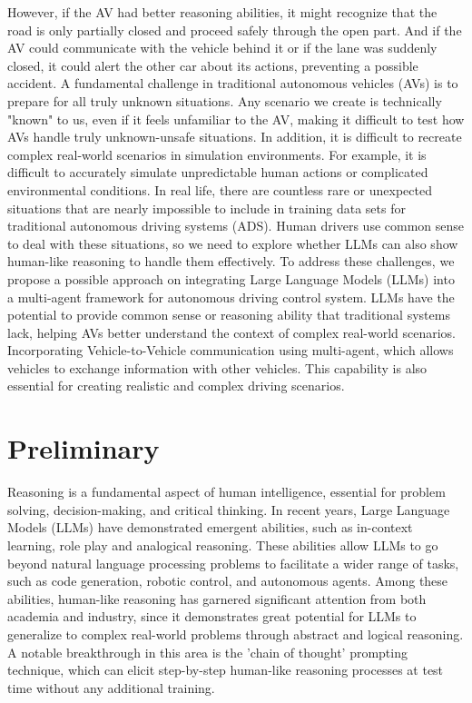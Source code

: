 \documentclass[conference]{IEEEtran}
\begin{document}
However, if the AV had better reasoning abilities, it might recognize that the road is only partially closed and proceed safely through the open part. And if the AV could communicate with the vehicle behind it or if the lane was suddenly closed, it could alert the other car about its actions, preventing a possible accident.
A fundamental challenge in traditional autonomous vehicles (AVs) is to prepare for all truly unknown situations\cite{singh2024systematic}. Any scenario we create is technically "known" to us, even if it feels unfamiliar to the AV, making it difficult to test how AVs handle truly unknown-unsafe situations. In addition, it is difficult to recreate complex real-world scenarios in simulation environments. For example, it is difficult to accurately simulate unpredictable human actions or complicated environmental conditions. In real life, there are countless rare or unexpected situations that are nearly impossible to include in training data sets for traditional autonomous driving systems (ADS). Human drivers use common sense to deal with these situations, so we need to explore whether LLMs can also show human-like reasoning to handle them effectively. To address these challenges, we propose a possible approach on integrating Large Language Models (LLMs) into a multi-agent framework for autonomous driving control system. LLMs have the potential to provide common sense or reasoning ability that traditional systems lack, helping AVs better understand the context of complex real-world scenarios. Incorporating Vehicle-to-Vehicle communication using multi-agent, which allows vehicles to exchange information with other vehicles. This capability is also essential for creating realistic and complex driving scenarios.

\section{Preliminary}
Reasoning is a fundamental aspect of human intelligence, essential for problem solving, decision-making, and critical thinking. In recent years, Large Language Models (LLMs) have demonstrated emergent abilities\cite{wei2022emergent}, such as in-context learning\cite{dong2022survey}, role play\cite{shanahan2023role} and analogical reasoning\cite{wei2022chain}. These abilities allow LLMs to go beyond natural language processing problems to facilitate a wider range of tasks, such as code generation\cite{gehring2024rlef}, robotic control\cite{ahn2022can}, and autonomous agents\cite{deng2023mind2web}. Among these abilities, human-like reasoning has garnered significant attention from both academia and industry, since it demonstrates great potential for LLMs to generalize to complex real-world problems through abstract and logical reasoning. A notable breakthrough in this area is the 'chain of thought' prompting technique\cite{wei2022chain}, which can elicit step-by-step human-like reasoning processes at test time without any additional training. 
\end{document}
